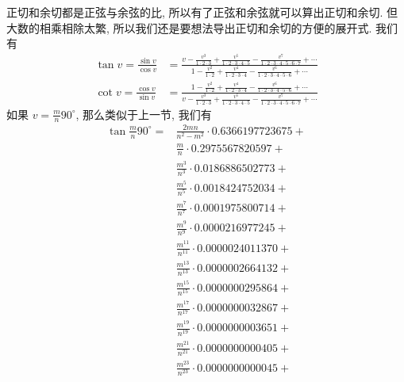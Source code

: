 正切和余切都是正弦与余弦的比, 所以有了正弦和余弦就可以算出正切和余切. 但 大数的相乘相除太繁, 所以我们还是要想法导出正切和余切的方便的展开式. 我们有
\[
\begin{aligned}
\tan v=\frac{\sin v}{\cos v} & =\frac{v-\frac{v^{3}}{1 \cdot 2 \cdot 3}+\frac{v^{5}}{1 \cdot 2 \cdot 3 \cdot 4 \cdot 5}-\frac{v^{7}}{1 \cdot 2 \cdot 3 \cdot 4 \cdot 5 \cdot 6 \cdot 7}+\cdots}{1-\frac{v^{2}}{1 \cdot 2}+\frac{v^{4}}{1 \cdot 2 \cdot 3 \cdot 4}-\frac{v^{6}}{1 \cdot 2 \cdot 3 \cdot 4 \cdot 5 \cdot 6}+\cdots} \\
\cot v=\frac{\cos v}{\sin v} & =\frac{1-\frac{v^{2}}{1 \cdot 2}+\frac{v^{4}}{1 \cdot 2 \cdot 3 \cdot 4}-\frac{v^{6}}{1 \cdot 2 \cdot 3 \cdot 4 \cdot 5 \cdot 6}+\cdots}{v-\frac{v^{3}}{1 \cdot 2 \cdot 3}+\frac{v^{5}}{1 \cdot 2 \cdot 3 \cdot 4 \cdot 5}-\frac{v^{7}}{1 \cdot 2 \cdot 3 \cdot 4 \cdot 5 \cdot 6 \cdot 7}+\cdots}
\end{aligned}
\]
如果 $v=\frac{m}{n} 90^{\circ}$, 那么类似于上一节, 我们有
\[
\begin{aligned}
\tan \frac{m}{n} 90^{\circ}= & \frac{2 m n}{n^{2}-m^{2}} \cdot 0.6366197723675+ \\
& \frac{m}{n} \cdot 0.2975567820597+ \\
& \frac{m^{3}}{n^{3}} \cdot 0.0186886502773+ \\
& \frac{m^{5}}{n^{5}} \cdot 0.0018424752034+ \\
& \frac{m^{7}}{n^{7}} \cdot 0.0001975800714+ \\
& \frac{m^{9}}{n^{9}} \cdot 0.0000216977245+ \\
& \frac{m^{11}}{n^{11}} \cdot 0.0000024011370+ \\
& \frac{m^{13}}{n^{13}} \cdot 0.0000002664132+ \\
& \frac{m^{15}}{n^{15}} \cdot 0.0000000295864+ \\
& \frac{m^{17}}{n^{17}} \cdot 0.0000000032867+ \\
& \frac{m^{19}}{n^{19}} \cdot 0.0000000003651+ \\
& \frac{m^{21}}{n^{21}} \cdot 0.0000000000405+ \\
& \frac{m^{23}}{n^{23}} \cdot 0.0000000000045+
\end{aligned}
\]
